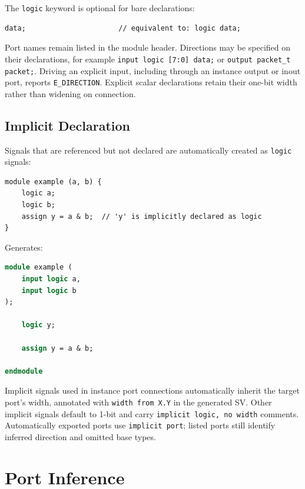 \documentclass[lang=en,11pt]{elegantbook}
\newcommand{\code}[1]{\texttt{#1}}
\begin{document}
The \code{logic} keyword is optional for bare declarations:

\begin{lstlisting}[language=Slip]
data;                      // equivalent to: logic data;
\end{lstlisting}

Port names remain listed in the module header. Directions may be specified on
their declarations, for example \code{input logic [7:0] data;} or
\code{output packet\_t packet;}. Driving an explicit input, including through an
instance output or inout port, reports \code{E\_DIRECTION}. Explicit scalar
declarations retain their one-bit width rather than widening on connection.

\section{Implicit Declaration}

Signals that are referenced but not declared are automatically created as \code{logic} signals:

\begin{lstlisting}[language=Slip]
module example (a, b) {
    logic a;
    logic b;
    assign y = a & b;  // 'y' is implicitly declared as logic
}
\end{lstlisting}

Generates:

\begin{lstlisting}[language=SystemVerilog]
module example (
    input logic a,
    input logic b
);

    logic y;

    assign y = a & b;

endmodule
\end{lstlisting}

Implicit signals used in instance port connections automatically inherit the target port's width, annotated with \code{width from X.Y} in the generated SV. Other implicit signals default to 1-bit and carry \code{implicit logic, no width} comments. Automatically exported ports use \code{implicit port}; listed ports still identify inferred direction and omitted base types.

\chapter{Port Inference}
\label{ch:port-inference}
\end{document}
